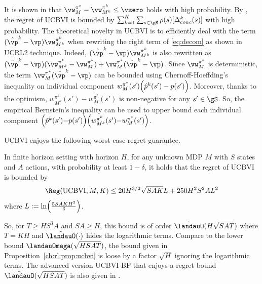 It is shown in \cite{azar2017minimax} that $\vw^{\pi^*}_M- \vw^{\pi^k}_{M^k}\le \vzero$ holds with high probability.
By , the regret of UCBVI is bounded by ${\sum_{k=1}^K\sum_{s\in\gS}\rho(s)[\Delta_{conc}^k(s)]}$ with high probability.
The theoretical novelty in UCBVI is to efficiently deal with the term $(\hat{\vp}^k-\vp)\vw^{\pi^k}_{M^k}$ when rewriting the right term of \eqref{eq:decom} as shown in UCRL2 technique.
Indeed, $(\hat{\vp}^k-\vp)\vw^{\pi^k}_{M^k}$ is also rewritten as $(\hat{\vp}^k-\vp)(\vw^{\pi^k}_{M^k}-\vw^{\pi^*}_{M}) +\vw^{\pi^*}_{M}(\hat{\vp}^k-\vp)$.
Since $\vw^{\pi^*}_M$ is deterministic, the term $\vw^{\pi^*}_{M}(\hat{\vp}^k-\vp)$ can be bounded using Chernoff-Hoeffding's inequality on individual component $w^{\pi^*}_{M}(s')\Bigl(\hat{p}^k(s')-p(s')\Bigr)$.
Moreover, thanks to the optimism, $w^{\pi^k}_{M^k}(s')-w^{\pi^*}_{M}(s')$ is non-negative for any $s'\in\gS$.
So, the empirical Bernstein's inequality can be used to upper bound each individual component $\Bigl(\hat{p}^k(s'){-}p(s')\Bigr)\Bigl(w^{\pi^k}_{M^k}(s'){-}w^{\pi^*}_{M}(s')\Bigr)$.

UCBVI enjoys the following worst-case regret guarantee.
\begin{prop}
    \label{ch:rl:prop:ucbvi}
    In finite horizon setting with horizon $H$, for any unknown MDP $M$ with $S$ states and $A$ actions,
    with probability at least $1-\delta$, it holds that the regret of UCBVI is bounded by
    \begin{align*}
        \Reg(\textnormal{UCBVI}, M, K) \le 20H^{3/2}\sqrt{SAK}L +250H^2S^2AL^2
    \end{align*}
    where $L:=\ln\Bigl(\frac{5SAKH^2}{\delta}\Bigr)$.
\end{prop}
So, for $T\ge HS^3A$ and $SA\ge H$, this bound is of order $\tilde{\landauO}(H\sqrt{SAT})$ where $T=KH$ and $\tilde{\landauO}(\cdot)$ hides the logarithmic terms.
Compare to the lower bound $\landauOmega(\sqrt{HSAT})$, the bound given in Proposition~\ref{ch:rl:prop:ucbvi} is loose by a factor $\sqrt{H}$ ignoring the logarithmic terms.
The advanced version UCBVI-BF that enjoys a regret bound $\tilde{\landauO}(\sqrt{HSAT})$ is also given in \cite{azar2017minimax}.%


